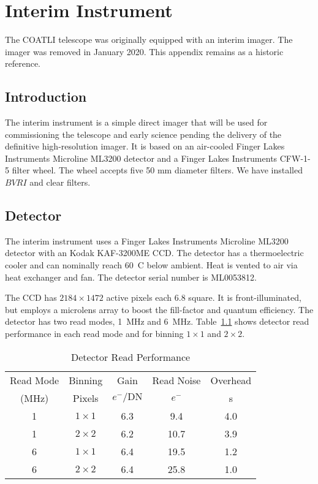 \chapter{Interim Instrument}
\label{chapter:interim-instrument}

The COATLI telescope was originally equipped with an interim imager. The imager was removed in January 2020. This appendix remains as a historic reference.

\section{Introduction}

The interim instrument is a simple direct imager that will be used for commissioning the telescope and early science pending the delivery of the definitive high-resolution imager. It is based on an air-cooled Finger Lakes Instruments Microline ML3200 detector and a Finger Lakes Instruments CFW-1-5 filter wheel. The wheel accepts five 50 mm diameter filters. We have installed $BVRI$ and clear filters.

\section{Detector}

The interim instrument uses a Finger Lakes Instruments Microline ML3200 detector with an Kodak KAF-3200ME CCD. The detector has a thermoelectric cooler and can nominally reach 60~C below ambient. Heat is vented to air via heat exchanger and fan. The detector serial number is ML0053812.

The CCD has $2184 \times 1472$ active pixels each 6.8 {\micron} square. It is front-illuminated, but employs a microlens array to boost the fill-factor and quantum efficiency. The detector has two read modes, 1~MHz and 6~MHz. Table~\ref{table:detector-read-performance} shows detector read performance in each read mode and for binning $1\times1$ and $2\times2$.

\begin{table}
\caption{Detector Read Performance}
\label{table:detector-read-performance}
\begin{center}
\begin{tabular}{ccccc}
\hline
\hline
Read Mode&Binning&Gain&Read Noise&Overhead\\
(MHz)&Pixels&$e^-/\mathrm{DN}$&$e^-$&s\\
\hline
1&$1 \times 1$&6.3&\phantom{0}9.4&4.0\\
1&$2 \times 2$&6.2&\phantom{}10.7&3.9\\
6&$1 \times 1$&6.4&\phantom{}19.5&1.2\\
6&$2 \times 2$&6.4&\phantom{}25.8&1.0\\
\hline
\end{tabular}
\end{center}
\end{table}

